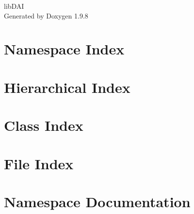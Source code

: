\documentclass[twoside]{book}
\newcommand{\+}{\discretionary{\mbox{\scriptsize$\hookleftarrow$}}{}{}}
\newcommand{\clearemptydoublepage}{%
    \newpage{\pagestyle{empty}\cleardoublepage}%
  }
\begin{document}
  \raggedbottom
    \hypersetup{pageanchor=false,
                bookmarksnumbered=true,
                pdfencoding=unicode
               }
  \begin{titlepage}
  \vspace*{7cm}
  \begin{center}%
  {\Large lib\+DAI}\\
  \vspace*{1cm}
  {\large Generated by Doxygen 1.9.8}\\
  \end{center}
  \end{titlepage}
  \clearemptydoublepage
  \tableofcontents
  \clearemptydoublepage
  \hypersetup{pageanchor=true}













\chapter{Namespace Index}

\chapter{Hierarchical Index}

\chapter{Class Index}

\chapter{File Index}

\chapter{Namespace Documentation}

\end{document}
